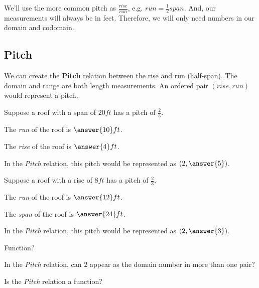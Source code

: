 \documentclass{ximera}
\begin{document}
We'll use the more common pitch as $\frac{rise}{run}$, e.g. $run = \frac{1}{2} span$. And, our measurements will always be in feet.  Therefore, we will only need numbers in our domain and codomain.



\subsection*{Pitch}
We can create the \textbf{Pitch} relation between the rise and run (half-span).  The domain and range are both length measurements.  An ordered pair $(rise, run)$ would represent a pitch.








\begin{question}

Suppose a roof with a span of $20 ft$ has a pitch of $\frac{2}{5}$.  

The \textit{run} of the roof is $\answer{10} ft$.

The \textit{rise} of the roof is $\answer{4} ft$.

In the \textit{Pitch} relation, this pitch would be represented as $\left( 2, \answer{5} \right)$.

\end{question}











\begin{question}

Suppose a roof with a rise of $8 ft$ has a pitch of $\frac{2}{3}$.  

The \textit{run} of the roof is $\answer{12} ft$.

The \textit{span} of the roof is $\answer{24} ft$.

In the \textit{Pitch} relation, this pitch would be represented as $\left( 2, \answer{3} \right)$.

\end{question}



\begin{exercise}  Function?

In the \textit{Pitch} relation, can $2$ appear as the domain number in more than one pair?
\begin{multipleChoice}
\end{multipleChoice}





Is the \textit{Pitch} relation a function?
\begin{multipleChoice}
\end{multipleChoice}

\end{exercise}
\end{document}
